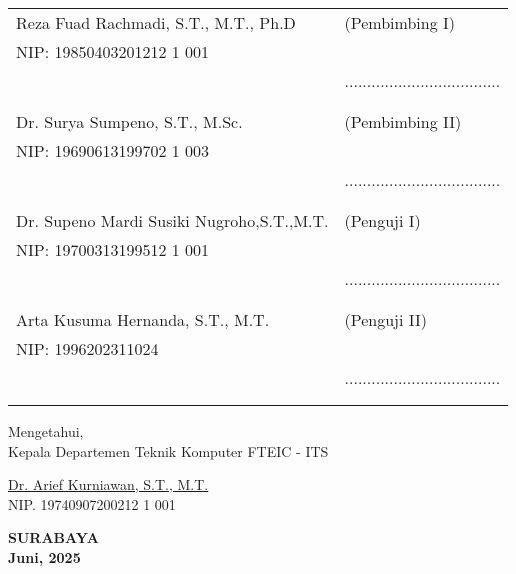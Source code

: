 \noindent
\begin{tabularx}{\textwidth}{X l}
  Reza Fuad Rachmadi, S.T., M.T., Ph.D               & (Pembimbing I)                      \\
  NIP: 19850403201212 1 001       &                                     \\
                           & ................................... \\
                           &                                     \\
                           &                                     \\
  Dr. Surya Sumpeno, S.T., M.Sc.             & (Pembimbing II)                     \\
  NIP: 19690613199702 1 003     &                                     \\
                           & ................................... \\
                           &                                     \\
                           &                                     \\
  Dr. Supeno Mardi Susiki Nugroho,S.T.,M.T.          & (Penguji I)                         \\
  NIP: 19700313199512 1 001   &                                     \\
                           & ................................... \\
                           &                                     \\
                           &                                     \\
  Arta Kusuma Hernanda, S.T., M.T.          & (Penguji II)                        \\
  NIP: 1996202311024   &                                     \\
                           & ................................... \\
                           &                                     \\
                           &                                     \\
  
\end{tabularx}
\endgroup

\begin{center}
  Mengetahui, \\
  Kepala Departemen {Teknik Komputer} {FTEIC} - ITS\\

  \vspace{8ex}

  \underline{ Dr. Arief Kurniawan, S.T., M.T.} \\
  NIP. 19740907200212 1 001
\end{center}

\begin{center}
  \textbf{SURABAYA} \\
  \textbf{Juni, 2025}
\end{center}
\endgroup
